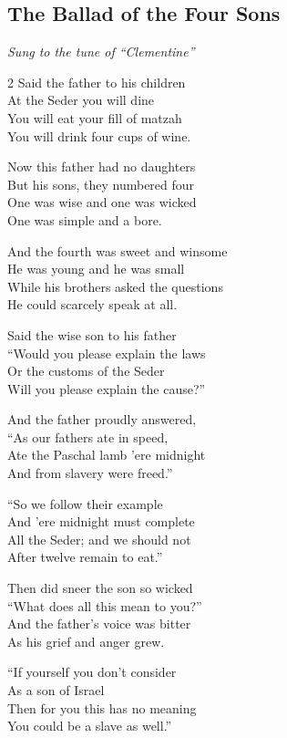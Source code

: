 \documentclass[12pt]{article}
\begin{document}
\subsection*{The Ballad of the Four Sons}
\textit{Sung to the tune of ``Clementine''}
\begin{multicols}{2}
Said the father to his children \\
At the Seder you will dine \\
You will eat your fill of matzah \\
You will drink four cups of wine.

Now this father had no daughters \\
But his sons, they numbered four \\
One was wise and one was wicked \\
One was simple and a bore.

And the fourth was sweet and winsome \\
He was young and he was small \\
While his brothers asked the questions \\
He could scarcely speak at all.

Said the wise son to his father \\
``Would you please explain the laws \\
Or the customs of the Seder \\
Will you please explain the cause?''

And the father proudly answered, \\
``As our fathers ate in speed, \\
Ate the Paschal lamb 'ere midnight \\
And from slavery were freed.''

``So we follow their example \\
And 'ere midnight must complete \\
All the Seder; and we should not \\
After twelve remain to eat.''

Then did sneer the son so wicked \\
``What does all this mean to you?'' \\
And the father's voice was bitter \\
As his grief and anger grew.

``If yourself you don't consider \\
As a son of Israel \\
Then for you this has no meaning \\
You could be a slave as well.''


\end{multicols}
\end{document}
